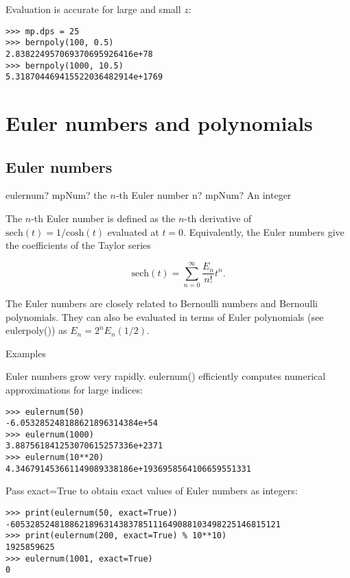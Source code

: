 Evaluation is accurate for large and small $z$:

\begin{lstlisting}
>>> mp.dps = 25
>>> bernpoly(100, 0.5)
2.838224957069370695926416e+78
>>> bernpoly(1000, 10.5)
5.318704469415522036482914e+1769
\end{lstlisting}



\newpage
\section{Euler numbers and polynomials}


\subsection{Euler numbers}

\begin{mpFunctionsExtract}
	\mpFunctionOne
	{eulernum? mpNum? the $n$-th Euler number}
	{n? mpNum? An integer}	
\end{mpFunctionsExtract}

\vpara
The $n$-th Euler number is defined as the $n$-th derivative of $\text{sech}(t)=1/\text{cosh}(t)$ evaluated at $t=0$. Equivalently, the Euler numbers give the coefficients of the Taylor series

\begin{equation}
\text{sech}(t) = \sum_{n=0}^{\infty} \frac{E_n}{n!} t^n.
\end{equation}

The Euler numbers are closely related to Bernoulli numbers and Bernoulli polynomials. They can also be evaluated in terms of Euler polynomials (see eulerpoly()) as $E_n=2^n E_n(1/2)$.

Examples

Euler numbers grow very rapidly. eulernum() efficiently computes numerical approximations for large indices:

\begin{lstlisting}
>>> eulernum(50)
-6.053285248188621896314384e+54
>>> eulernum(1000)
3.887561841253070615257336e+2371
>>> eulernum(10**20)
4.346791453661149089338186e+1936958564106659551331
\end{lstlisting}

Pass exact=True to obtain exact values of Euler numbers as integers:

\begin{lstlisting}
>>> print(eulernum(50, exact=True))
-6053285248188621896314383785111649088103498225146815121
>>> print(eulernum(200, exact=True) % 10**10)
1925859625
>>> eulernum(1001, exact=True)
0
\end{lstlisting}


